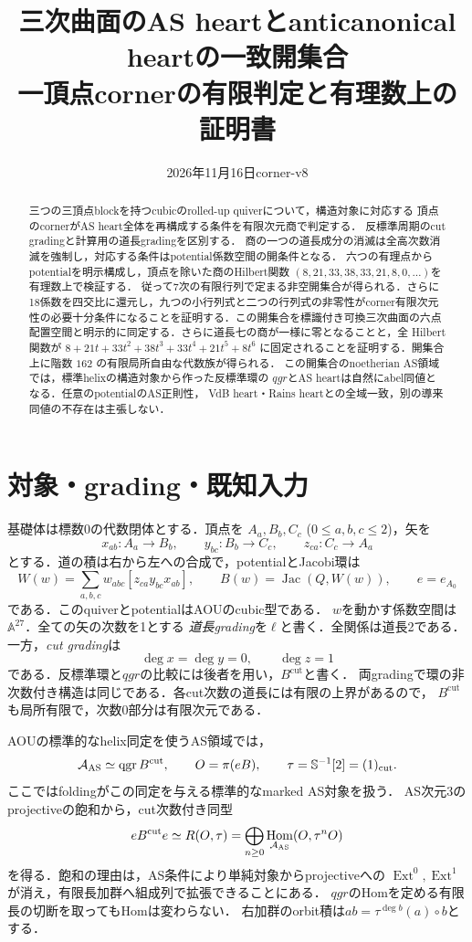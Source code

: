 \documentclass[11pt,a4paper]{ltjsarticle}
\title{三次曲面のAS heartとanticanonical heartの一致開集合\\\large 一頂点cornerの有限判定と有理数上の証明書}
\author{}
\date{2026年11月16日\quad corner-v8}
\theoremstyle{definition}\newtheorem{remark}[theorem]{注意}
\DeclareMathOperator{\qgr}{qgr}\DeclareMathOperator{\Hom}{Hom}\DeclareMathOperator{\Ext}{Ext}
\DeclareMathOperator{\Jac}{Jac}\DeclareMathOperator{\Spec}{Spec}
\begin{document}
\maketitle
\begin{abstract}
三つの三頂点blockを持つcubicのrolled-up quiverについて，構造対象に対応する
頂点のcornerがAS heart全体を再構成する条件を有限次元商で判定する．
反標準周期のcut gradingと計算用の道長gradingを区別する．
商の一つの道長成分の消滅は全高次数消滅を強制し，対応する条件はpotential係数空間の開条件となる．
六つの有理点からpotentialを明示構成し，頂点を除いた商のHilbert関数
$(8,21,33,38,33,21,8,0,\ldots)$を有理数上で検証する．
従って7次の有限行列で定まる非空開集合が得られる．さらに18係数を四交比に還元し，九つの小行列式と二つの行列式の非零性がcorner有限次元性の必要十分条件になることを証明する．この開集合を標識付き可換三次曲面の六点配置空間と明示的に同定する．さらに道長七の商が一様に零となることと，全 Hilbert 関数が $8+21t+33t^2+38t^3+33t^4+21t^5+8t^6$ に固定されることを証明する．開集合上に階数 $162$ の有限局所自由な代数族が得られる．
この開集合のnoetherian AS領域では，標準helixの構造対象から作った反標準環の
$qgr$とAS heartは自然にabel同値となる．任意のpotentialのAS正則性，
VdB heart・Rains heartとの全域一致，別の導来同値の不存在は主張しない．
\end{abstract}

\section{対象・grading・既知入力}
基礎体は標数0の代数閉体とする．頂点を
$A_a,B_b,C_c$ ($0\le a,b,c\le2$)，矢を
\[
 x_{ab}:A_a\to B_b,\qquad y_{bc}:B_b\to C_c,\qquad z_{ca}:C_c\to A_a
\]
とする．道の積は右から左への合成で，potentialとJacobi環は
\[
 W(w)=\sum_{a,b,c}w_{abc}[z_{ca}y_{bc}x_{ab}],\qquad
 B(w)=\Jac(Q,W(w)),\qquad e=e_{A_0}
\]
である．このquiverとpotentialはAOU\cite[\S4]{AOU}のcubic型である．
$w$を動かす係数空間は$\mathbb A^{27}$．全ての矢の次数を1とする
\emph{道長grading}を$\ell$と書く．全関係は道長2である．
一方，\emph{cut grading}は
\[
 \deg x=\deg y=0,\qquad\deg z=1
\]
である．反標準環と$qgr$の比較には後者を用い，$B^{\mathrm{cut}}$と書く．
両gradingで環の非次数付き構造は同じである．各cut次数の道長には有限の上界があるので，
$B^{\mathrm{cut}}$も局所有限で，次数0部分は有限次元である．

AOU\cite[(3.19), (4.9), (4.13)]{AOU}の標準的なhelix同定を使うAS領域では，
\[
 \cA_{\mathrm{AS}}\simeq\qgr B^{\mathrm{cut}},\qquad
 O=\pi(eB),\qquad \tau=\mathbb S^{-1}[2]=(1)_{\mathrm{cut}}.
\]
ここではfoldingがこの同定を与える標準的なmarked AS対象を扱う．
AS次元3のprojectiveの飽和から，cut次数付き同型
\begin{equation}\label{eq:orbit}
 eB^{\mathrm{cut}}e\simeq R(O,\tau)
 =\bigoplus_{n\ge0}\Hom_{\cA_{\mathrm{AS}}}(O,\tau^nO)
\end{equation}
を得る．飽和の理由は，AS条件により単純対象からprojectiveへの
$\Ext^0,\Ext^1$が消え，有限長加群へ組成列で拡張できることにある．
$qgr$のHomを定める有限長の切断を取ってもHomは変わらない．
右加群のorbit積は$ab=\tau^{\deg b}(a)\circ b$とする．
\end{document}
